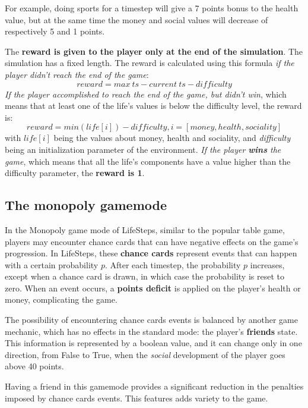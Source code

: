\documentclass{article}
\begin{document}
For example, doing sports for a timestep will give a 7 points bonus to the health value, but at the same time the money and social values will decrease of respectively 5 and 1 points.

The \textbf{reward is given to the player only at the end of the simulation}. The simulation has a fixed length. The reward is calculated using this formula \textit{if the player didn't reach the end of the game}:
\begin{displaymath}
    reward = {max\ ts} - {current\ ts} - {difficulty}
\end{displaymath}
\textit{If the player accomplished to reach the end of the game, but didn't win}, which means that at least one of the life's values is below the difficulty level, the reward is:
\begin{displaymath}
    reward = min(life[i]) - difficulty, i=[money, health, sociality]
\end{displaymath}
with \(life[i]\) being the values about money, health and sociality, and \textit{difficulty} being an initialization parameter of the environment. \textit{If the player \textbf{wins} the game}, which means that all the life's components have a value higher than the difficulty parameter, the \textbf{reward is 1}.

\subsection{The monopoly gamemode}

In the Monopoly game mode of LifeSteps, similar to the popular table game, players may encounter chance cards that can have negative effects on the game's progression. In LifeSteps, these \textbf{chance cards} represent events that can happen with a certain probability \(p\). After each timestep, the probability \(p\) increases, except when a chance card is drawn, in which case the probability is reset to zero. When an event occurs, a \textbf{points deficit} is applied on the player's health or money, complicating the game. 

The possibility of encountering chance cards events is balanced by another game mechanic, which has no effects in the standard mode: the player's \textbf{friends} state. This information is represented by a boolean value, and it can change only in one direction, from False to True, when the \textit{social} development of the player goes above 40 points. 

Having a friend in this gamemode provides a significant reduction in the penalties imposed by chance cards events. This features adds variety to the game.
\end{document}
